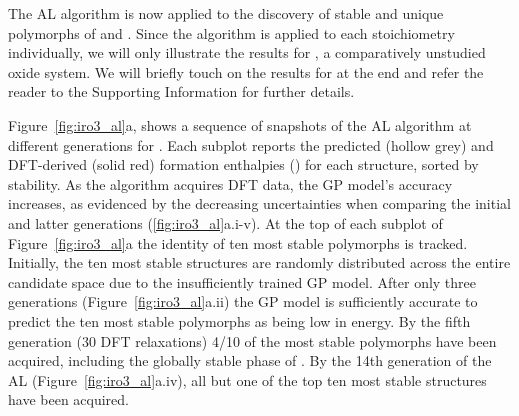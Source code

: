 %



%
The AL algorithm is now applied to the discovery of stable and unique polymorphs of \IrOtwo and \IrOthree.
%
Since the algorithm is applied to each stoichiometry individually,
we will only illustrate the results for \IrOthree,
a comparatively unstudied oxide system.
%
We will briefly touch on the results for \IrOtwo at the end and refer the reader to the Supporting Information for further details.


%
%
Figure~\ref{fig:iro3_al}a, shows a sequence of snapshots of the AL algorithm at different generations for \IrOthree.
%
Each subplot reports the predicted (hollow grey) and DFT-derived (solid red) formation enthalpies (\DHf) for each structure, sorted by stability.
%
As the algorithm acquires DFT data, the GP model's accuracy increases,
as evidenced by the decreasing uncertainties when comparing the initial and latter generations (\ref{fig:iro3_al}a.i-v).
%
At the top of each subplot of Figure~\ref{fig:iro3_al}a the identity of ten most stable polymorphs is tracked.
%
Initially, the ten most stable structures are randomly distributed across the entire candidate space due to the insufficiently trained GP model.
%
After only three generations (Figure~\ref{fig:iro3_al}a.ii) the GP model is sufficiently accurate to predict the ten most stable polymorphs as being low in energy.
%
By the fifth generation (\num{30} DFT relaxations) \num{4/10} of the most stable polymorphs have been acquired,
including the globally stable phase of \IrOthree.
%
By the 14th generation of the AL
(Figure~\ref{fig:iro3_al}a.iv),
all but one of the top ten most stable structures have been acquired.


